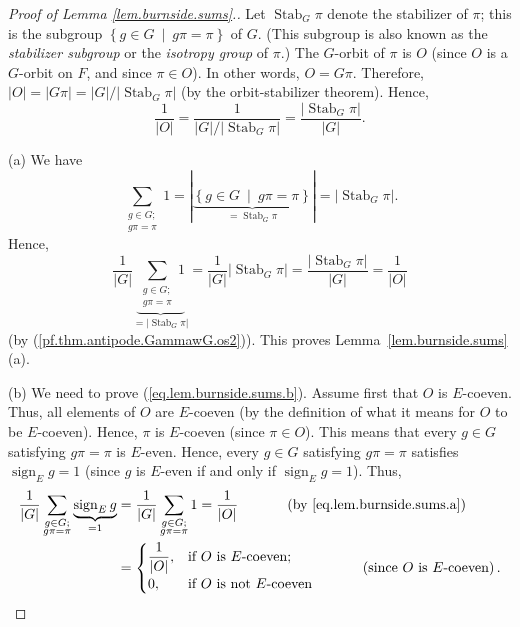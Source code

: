 \documentclass[12pt]{article}
\theoremstyle{plain}
\theoremstyle{definition}
\theoremstyle{remark}
\let\sumnonlimits\sum
\renewcommand{\sum}{\sumnonlimits\limits}
\newcommand{\sign}{\operatorname{sign}}
\newcommand{\Stab}{\operatorname{Stab}}
\begin{document}
\begin{proof}
[Proof of Lemma \ref{lem.burnside.sums}.] Let $\Stab_{G}\pi$
denote the stabilizer of $\pi$; this is the subgroup $\left\{  g\in
G\ \mid\ g\pi=\pi\right\}  $ of $G$. (This subgroup is also known as
the \textit{stabilizer subgroup} or the \textit{isotropy group} of
$\pi$.) The $G$-orbit of $\pi$ is $O$ (since $O$
is a $G$-orbit on $F$, and since $\pi\in O$). In other words, $O = G\pi$.
Therefore,
$\left\vert O\right\vert =\left\vert G\pi\right\vert
= \left\vert G\right\vert / \left\vert \Stab_G \pi \right\vert$
(by the orbit-stabilizer theorem). Hence,
\begin{equation}
\dfrac{1}{\left\vert O\right\vert }
= \dfrac{1}{\left\vert G\right\vert / \left\vert \Stab_G \pi \right\vert}
= \dfrac{\left\vert \Stab_G \pi \right\vert}{\left\vert G\right\vert}
.
\label{pf.thm.antipode.GammawG.os2}
\end{equation}


(a) We have%
\[
\sum_{\substack{g\in G;\\g\pi=\pi}}1=\left\vert \underbrace{\left\{  g\in
G\ \mid\ g\pi=\pi\right\}  }_{= \Stab_G \pi
}\right\vert =\left\vert  \Stab_G \pi\right\vert .
\]
Hence,
\[
\dfrac{1}{\left\vert G\right\vert }
\underbrace{\sum_{\substack{g \in G;\\ g \pi = \pi}} 1}_{
 = \left\vert \Stab_G \pi \right\vert}
= \dfrac{1}{\left\vert G\right\vert }
\left\vert \Stab_G \pi \right\vert
= \dfrac{\left\vert \Stab_G \pi \right\vert }{
\left\vert G\right\vert }
= \dfrac{1}{\left\vert O\right\vert }
\]
(by (\ref{pf.thm.antipode.GammawG.os2})). This proves
Lemma~\ref{lem.burnside.sums} (a).

(b) We need to prove (\ref{eq.lem.burnside.sums.b}). Assume first that $O$ is
$E$-coeven. Thus, all elements of $O$ are $E$-coeven (by the
definition of what it means for
$O$ to be $E$-coeven). Hence, $\pi$ is $E$-coeven (since $\pi \in O$).
This means that every $g\in G$ satisfying $g\pi=\pi$ is
$E$-even. Hence, every $g\in G$ satisfying $g\pi=\pi$ satisfies
$\sign_E g = 1$ (since $g$ is $E$-even if and only if
$\sign_E g = 1$). Thus,
\begin{align*}
\dfrac{1}{\left\vert G\right\vert }\sum_{\substack{g\in G;\\g\pi=\pi
}}\underbrace{\sign_E g}_{=1} &  =\dfrac
{1}{\left\vert G\right\vert }\sum_{\substack{g\in G;\\g\pi=\pi}}1=\dfrac
{1}{\left\vert O\right\vert }\ \ \ \ \ \ \ \ \ \ \left(  \text{by
\eqref{eq.lem.burnside.sums.a}}\right)  \\
&  =%
\begin{cases}
\dfrac{1}{\left\vert O\right\vert }, & \text{if }O\text{ is }E\text{-coeven}%
;\\
0, & \text{if }O\text{ is not }E\text{-coeven}%
\end{cases}
\ \ \ \ \ \ \ \ \ \ \left(  \text{since }O\text{ is }E\text{-coeven}\right)  .
\end{align*}



\end{proof}
\end{document}
